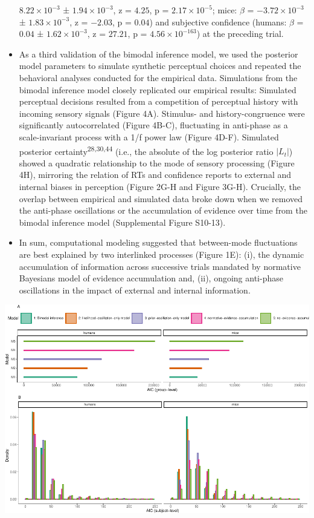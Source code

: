 \documentclass[
]{article}
\begin{document}
\begin{itemize}
  \(\ensuremath{8.22\times 10^{-3}}\) ±
  \(\ensuremath{1.94\times 10^{-3}}\), z = \(4.25\), p =
  \(\ensuremath{2.17\times 10^{-5}}\); mice: \(\beta\) =
  \(\ensuremath{-3.72\times 10^{-3}}\) ±
  \(\ensuremath{1.83\times 10^{-3}}\), z = \(-2.03\), p = \(0.04\)) and
  subjective confidence (humans: \(\beta\) = \(0.04\) ±
  \(\ensuremath{1.62\times 10^{-3}}\), z = \(27.21\), p =
  \(\ensuremath{4.56\times 10^{-163}}\)) at the preceding trial.
\item
  As a third validation of the bimodal inference model, we used the
  posterior model parameters to simulate synthetic perceptual choices
  and repeated the behavioral analyses conducted for the empirical data.
  Simulations from the bimodal inference model closely replicated our
  empirical results: Simulated perceptual decisions resulted from a
  competition of perceptual history with incoming sensory signals
  (Figure 4A). Stimulus- and history-congruence were significantly
  autocorrelated (Figure 4B-C), fluctuating in anti-phase as a
  scale-invariant process with a 1/f power law (Figure 4D-F). Simulated
  posterior certainty\textsuperscript{28,30,44} (i.e., the absolute of
  the log posterior ratio \(|L_t|\)) showed a quadratic relationship to
  the mode of sensory processing (Figure 4H), mirroring the relation of
  RTs and confidence reports to external and internal biases in
  perception (Figure 2G-H and Figure 3G-H). Crucially, the overlap
  between empirical and simulated data broke down when we removed the
  anti-phase oscillations or the accumulation of evidence over time from
  the bimodal inference model (Supplemental Figure S10-13).
\item
  In sum, computational modeling suggested that between-mode
  fluctuations are best explained by two interlinked processes (Figure
  1E): (i), the dynamic accumulation of information across successive
  trials mandated by normative Bayesians model of evidence accumulation
  and, (ii), ongoing anti-phase oscillations in the impact of external
  and internal information.
\end{itemize}

\includegraphics{modes_mouse_rev1b_files/figure-latex/Supplemental_Figure_S9_print-1.pdf}
\end{document}
